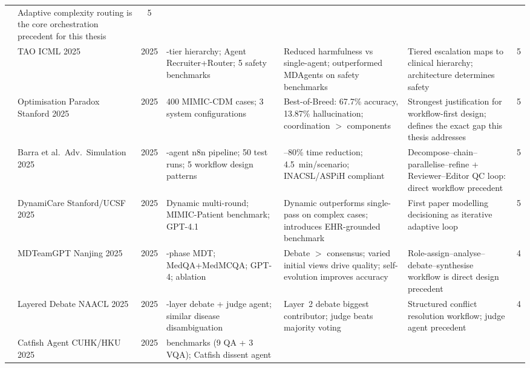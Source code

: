 \begin{table}[p]
\begin{adjustbox}{max width=\textwidth, max totalheight=0.93\textheight, keepaspectratio}
\begin{tabular}{%
  c
  >{\raggedright\arraybackslash}p{2.4cm}
  c
  >{\raggedright\arraybackslash}p{3.5cm}
  >{\raggedright\arraybackslash}p{3.9cm}
  >{\raggedright\arraybackslash}p{3.4cm}
  c}
  & Adaptive complexity routing is the core orchestration precedent for this thesis
  & 5 \\[3pt]
\cite{Kim2025TAO}
  & TAO \newline ICML 2025
  & 2025
  & 3-tier hierarchy; Agent Recruiter+Router; 5 safety benchmarks
  & Reduced harmfulness vs single-agent; outperformed MDAgents on safety benchmarks
  & Tiered escalation maps to clinical hierarchy; architecture determines safety
  & 5 \\[3pt]
\cite{Bedi2025OptParadox}
  & Optimisation Paradox \newline Stanford 2025
  & 2025
  & 2{,}400 MIMIC-CDM cases; 3 system configurations
  & Best-of-Breed: 67.7\% accuracy, 13.87\% hallucination; coordination $>$ components
  & Strongest justification for workflow-first design; defines the exact gap this thesis addresses
  & 5 \\[3pt]
\cite{Barra2025Agentic}
  & Barra et al.\ \newline Adv.\ Simulation 2025
  & 2025
  & 7-agent n8n pipeline; 50 test runs; 5 workflow design patterns
  & 70--80\% time reduction; 4.5~min/scenario; INACSL/ASPiH compliant
  & Decompose--chain--parallelise--refine + Reviewer--Editor QC loop: direct workflow precedent
  & 5 \\[3pt]
\cite{Shang2025DynamiCare}
  & DynamiCare \newline Stanford/UCSF 2025
  & 2025
  & Dynamic multi-round; MIMIC-Patient benchmark; GPT-4.1
  & Dynamic outperforms single-pass on complex cases; introduces EHR-grounded benchmark
  & First paper modelling decisioning as iterative adaptive loop
  & 5 \\[3pt]
\cite{Chen2025MDTeamGPT}
  & MDTeamGPT \newline Nanjing 2025
  & 2025
  & 4-phase MDT; MedQA+MedMCQA; GPT-4; ablation
  & Debate $>$ consensus; varied initial views drive quality; self-evolution improves accuracy
  & Role-assign--analyse--debate--synthesise workflow is direct design precedent
  & 4 \\[3pt]
\cite{Zhao2025LayeredDebate}
  & Layered Debate \newline NAACL 2025
  & 2025
  & 3-layer debate + judge agent; similar disease disambiguation
  & Layer~2 debate biggest contributor; judge beats majority voting
  & Structured conflict resolution workflow; judge agent precedent
  & 4 \\[3pt]
\cite{Wang2025Catfish}
  & Catfish Agent \newline CUHK/HKU 2025
  & 2025
  & 12 benchmarks (9 QA + 3 VQA); Catfish dissent agent

\end{tabular}
\end{adjustbox}
\end{table}
